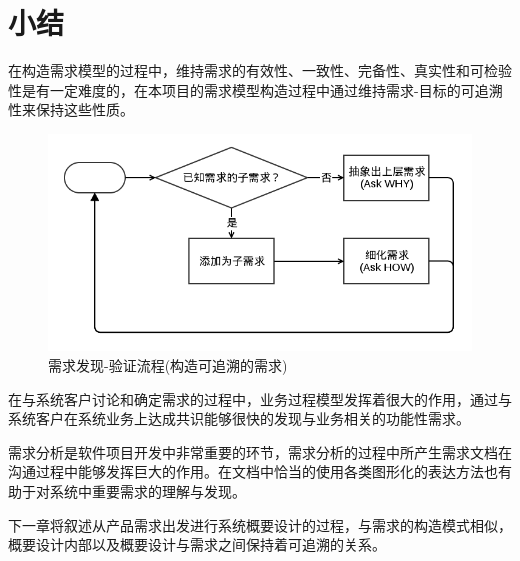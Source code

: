 \section{小结}

在构造需求模型的过程中，维持需求的有效性、一致性、完备性、真实性和可检验性是有一定难度的，在本项目的需求模型构造过程中通过维持需求-目标的可追溯性来保持这些性质。

\begin{figure}[!hbp]
  \begin{center}
    \includegraphics[scale=0.5]{figures/diagram-requirement-workflow.png}
    \caption{需求发现-验证流程(构造可追溯的需求)\label{RequirementExtraction}}
  \end{center}
\end{figure}

在与系统客户讨论和确定需求的过程中，业务过程模型发挥着很大的作用，通过与系统客户在系统业务上达成共识能够很快的发现与业务相关的功能性需求。

需求分析是软件项目开发中非常重要的环节，需求分析的过程中所产生需求文档在沟通过程中能够发挥巨大的作用。在文档中恰当的使用各类图形化的表达方法也有助于对系统中重要需求的理解与发现。

下一章将叙述从产品需求出发进行系统概要设计的过程，与需求的构造模式相似，概要设计内部以及概要设计与需求之间保持着可追溯的关系。

